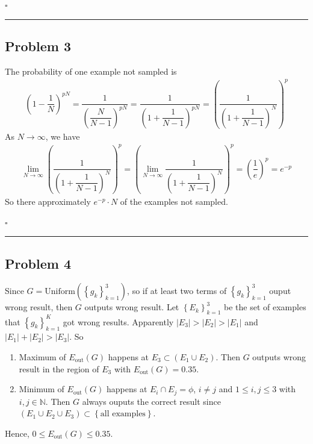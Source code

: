 \documentclass[12pt]{article}
\newcommand*{\QEDB}{\hfill\ensuremath{\square}}
\newcommand{\CBrackets}[1]{\left\{#1\right\}}
\newcommand{\ParTh}[1]{\left(#1\right)}
\newcommand{\AbsVal}[1]{\left|#1\right|}
\newcommand{\horrule}[1]{\rule{\linewidth}{#1}}
\begin{document}
\QEDB

\horrule{0.5pt}

\subsection*{Problem 3}

The probability of one example not sampled is
\begin{align}
\ParTh{1-\dfrac{1}{N}}^{pN}=\dfrac{1}{\ParTh{\dfrac{N}{N-1}}^{pN}}=\dfrac{1}{\ParTh{1+\dfrac{1}{N-1}}^{pN}}=\ParTh{\dfrac{1}{\ParTh{1+\dfrac{1}{N-1}}^{N}}}^p
\end{align}
As $N\rightarrow\infty$, we have
\begin{align}
\lim\limits_{N\rightarrow\infty}\ParTh{\dfrac{1}{\ParTh{1+\dfrac{1}{N-1}}^{N}}}^p=\ParTh{\lim\limits_{N\rightarrow\infty}\dfrac{1}{\ParTh{1+\dfrac{1}{N-1}}^{N}}}^p=\ParTh{\dfrac{1}{e}}^p=e^{-p}
\end{align}
So there approximately $e^{-p}\cdot N$ of the examples not sampled.

\QEDB

\horrule{0.5pt}

\subsection*{Problem 4}

Since $G=\text{Uniform}\ParTh{\CBrackets{g_k}^3_{k=1}}$, so if at least two terms of $\CBrackets{g_k}^3_{k=1}$ ouput wrong result, then $G$ outputs wrong result. Let $\CBrackets{E_k}^3_{k=1}$ be the set of examples that $\CBrackets{g_k}^K_{k=1}$ got wrong results. Apparently $\AbsVal{E_3}>\AbsVal{E_2}>\AbsVal{E_1}$ and $\AbsVal{E_1}+\AbsVal{E_2}>\AbsVal{E_3}$. So
\begin{enumerate}
	\item Maximum of $E_{\text{out}}\ParTh{G}$ happens at $E_3\subset\ParTh{E_1\cup E_2}$. Then $G$ outputs wrong result in the region of $E_3$ with $E_{\text{out}}\ParTh{G}=0.35$.
	\item Minimum of $E_{\text{out}}\ParTh{G}$ happens at $E_i\cap E_j=\phi$, $i\neq j$ and $1\leq i,j\leq 3$ with $i,j\in\mathbb{N}$. Then $G$ always ouputs the correct result since $\ParTh{E_1\cup E_2\cup E_3}\subset\CBrackets{\text{all examples}}$.
\end{enumerate}
Hence, $0\leq E_{\text{out}}\ParTh{G}\leq0.35$.

\end{document}
